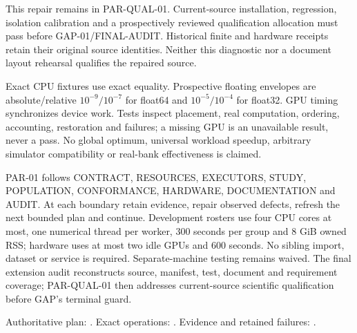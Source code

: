 This repair remains in PAR-QUAL-01. Current-source installation, regression,
isolation calibration and a prospectively reviewed qualification allocation
must pass before GAP-01/FINAL-AUDIT. Historical finite and hardware receipts
retain their original source identities. Neither this diagnostic nor a document
layout rehearsal qualifies the repaired source.

Exact CPU fixtures use exact equality. Prospective floating envelopes are
absolute/relative $10^{-9}/10^{-7}$ for float64 and $10^{-5}/10^{-4}$ for
float32. GPU timing synchronizes device work. Tests inspect placement, real
computation, ordering, accounting, restoration and failures; a missing GPU is
an unavailable result, never a pass. No global optimum, universal workload
speedup, arbitrary simulator compatibility or real-bank effectiveness is claimed.

PAR-01 follows CONTRACT, RESOURCES, EXECUTORS, STUDY, POPULATION, CONFORMANCE,
HARDWARE, DOCUMENTATION and AUDIT. At each boundary retain evidence, repair
observed defects, refresh the next bounded plan and continue. Development
rosters use four CPU cores at most, one numerical thread per worker, 300 seconds
per group and 8 GiB owned RSS; hardware uses at most two idle GPUs and 600
seconds. No sibling import, dataset or service is required. Separate-machine
testing remains waived. The final extension audit reconstructs source,
manifest, test, document and requirement coverage; PAR-QUAL-01 then addresses
current-source scientific qualification before GAP's terminal guard.

Authoritative plan: .
Exact operations: .
Evidence and retained failures: .

